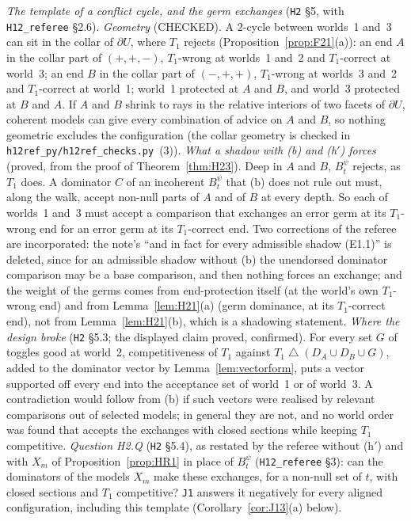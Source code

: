 \documentclass[11pt]{article}
\theoremstyle{definition}
\theoremstyle{remark}
\newcommand{\sd}{\mathbin{\triangle}}
\newcommand{\src}[1]{\texttt{#1}}
\begin{document}
\emph{The template of a conflict cycle, and the germ exchanges} (\src{H2} \S5, with \src{H12\_referee} \S2.6). \emph{Geometry} (CHECKED). A $2$-cycle between worlds~1 and~3 can sit in the collar of $\partial U$, where $T_1$ rejects (Proposition~\ref{prop:F21}(a)): an end $A$ in the collar part of $(+,+,-)$, $T_1$-wrong at worlds~1 and~2 and $T_1$-correct at world~3; an end $B$ in the collar part of $(-,+,+)$, $T_1$-wrong at worlds~3 and~2 and $T_1$-correct at world~1; world~1 protected at $A$ and $B$, and world~3 protected at $B$ and $A$. If $A$ and $B$ shrink to rays in the relative interiors of two facets of $\partial U$, coherent models can give every combination of advice on $A$ and $B$, so nothing geometric excludes the configuration (the collar geometry is checked in \src{h12ref\_py/h12ref\_checks.py}~(3)). \emph{What a shadow with (b) and (h$'$) forces} (proved, from the proof of Theorem~\ref{thm:H23}). Deep in $A$ and $B$, $B^\psi_t$ rejects, as $T_1$ does. A dominator $C$ of an incoherent $B^\psi_t$ that (b) does not rule out must, along the walk, accept non-null parts of $A$ and of $B$ at every depth. So each of worlds~1 and~3 must accept a comparison that exchanges an error germ at its $T_1$-wrong end for an error germ at its $T_1$-correct end. Two corrections of the referee are incorporated: the note's ``and in fact for every admissible shadow (E1.1)'' is deleted, since for an admissible shadow without (b) the unendorsed dominator comparison may be a base comparison, and then nothing forces an exchange; and the weight of the germs comes from end-protection itself (at the world's own $T_1$-wrong end) and from Lemma~\ref{lem:H21}(a) (germ dominance, at its $T_1$-correct end), not from Lemma~\ref{lem:H21}(b), which is a shadowing statement. \emph{Where the design broke} (\src{H2} \S5.3; the displayed claim proved, confirmed). For every set $G$ of toggles good at world~2, competitiveness of $T_1$ against $T_1\sd(D_A\cup D_B\cup G)$, added to the dominator vector by Lemma~\ref{lem:vectorform}, puts a vector supported off every end into the acceptance set of world~1 or of world~3. A contradiction would follow from (b) if such vectors were realised by relevant comparisons out of selected models; in general they are not, and no world order was found that accepts the exchanges with closed sections while keeping $T_1$ competitive. \emph{Question H2.Q} (\src{H2} \S5.4), as restated by the referee without (h$'$) and with $X_m$ of Proposition~\ref{prop:HR1} in place of $B^\psi_t$ (\src{H12\_referee} \S3): can the dominators of the models $X_m$ make these exchanges, for a non-null set of $t$, with closed sections and $T_1$ competitive? \src{J1} answers it negatively for every aligned configuration, including this template (Corollary~\ref{cor:J13}(a) below).
\end{document}
